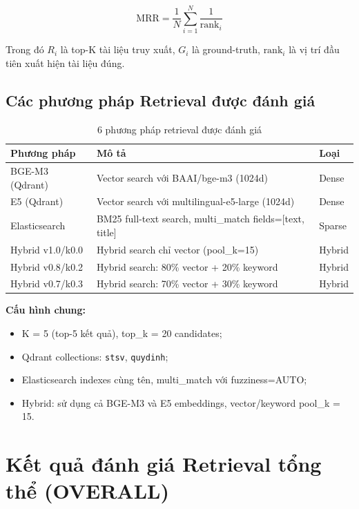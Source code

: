 \documentclass[../DoAn.tex]{subfiles}
\begin{document}
\begin{equation}
\text{MRR} = \frac{1}{N} \sum_{i=1}^{N} \frac{1}{\text{rank}_i}
\end{equation}

Trong đó $R_i$ là top-K tài liệu truy xuất, $G_i$ là ground-truth, $\text{rank}_i$ là vị trí đầu tiên xuất hiện tài liệu đúng.

\subsection{Các phương pháp Retrieval được đánh giá}

\begin{table}[H]
\centering
\begin{tabular}{|l|p{7.5cm}|l|}
\hline
\textbf{Phương pháp} & \textbf{Mô tả} & \textbf{Loại} \\
\hline
BGE-M3 (Qdrant) & Vector search với BAAI/bge-m3 (1024d) & Dense \\
\hline
E5 (Qdrant) & Vector search với multilingual-e5-large (1024d) & Dense \\
\hline
Elasticsearch & BM25 full-text search, multi\_match fields=[text, title] & Sparse \\
\hline
Hybrid v1.0/k0.0 & Hybrid search chỉ vector (pool\_k=15) & Hybrid \\
\hline
Hybrid v0.8/k0.2 & Hybrid search: 80\% vector + 20\% keyword & Hybrid \\
\hline
Hybrid v0.7/k0.3 & Hybrid search: 70\% vector + 30\% keyword & Hybrid \\
\hline
\end{tabular}
\caption{6 phương pháp retrieval được đánh giá}
\end{table}

\textbf{Cấu hình chung:}
\begin{itemize}
    \item K = 5 (top-5 kết quả), top\_k = 20 candidates;
    \item Qdrant collections: \texttt{stsv}, \texttt{quydinh};
    \item Elasticsearch indexes cùng tên, multi\_match với fuzziness=AUTO;
    \item Hybrid: sử dụng cả BGE-M3 và E5 embeddings, vector/keyword pool\_k = 15.
\end{itemize}

\section{Kết quả đánh giá Retrieval tổng thể (OVERALL)}
\end{document}
